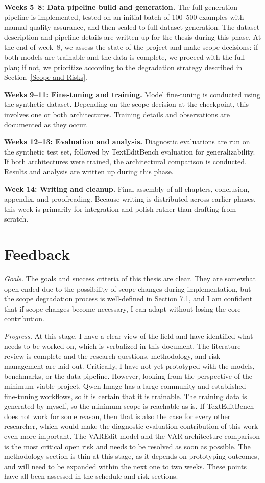 \textbf{Weeks 5--8: Data pipeline build and generation.} The full generation pipeline is implemented, tested on an initial batch of 100--500 examples with manual quality assurance, and then scaled to full dataset generation. The dataset description and pipeline details are written up for the thesis during this phase. At the end of week~8, we assess the state of the project and make scope decisions: if both models are trainable and the data is complete, we proceed with the full plan; if not, we prioritize according to the degradation strategy described in Section~\ref{Scope and Risks}.

\textbf{Weeks 9--11: Fine-tuning and training.} Model fine-tuning is conducted using the synthetic dataset. Depending on the scope decision at the checkpoint, this involves one or both architectures. Training details and observations are documented as they occur.

\textbf{Weeks 12--13: Evaluation and analysis.} Diagnostic evaluations are run on the synthetic test set, followed by TextEditBench evaluation for generalizability. If both architectures were trained, the architectural comparison is conducted. Results and analysis are written up during this phase.

\textbf{Week 14: Writing and cleanup.} Final assembly of all chapters, conclusion, appendix, and proofreading. Because writing is distributed across earlier phases, this week is primarily for integration and polish rather than drafting from scratch.

\chapter{Feedback} \label{Feedback}

\textit{Goals.} The goals and success criteria of this thesis are clear. They are somewhat open-ended due to the possibility of scope changes during implementation, but the scope degradation process is well-defined in Section 7.1, and I am confident that if scope changes become necessary, I can adapt without losing the core contribution.

\textit{Progress.} At this stage, I have a clear view of the field and have identified what needs to be worked on, which is verbalized in this document. The literature review is complete and the research questions, methodology, and risk management are laid out. Critically, I have not yet prototyped with the models, benchmarks, or the data pipeline. However, looking from the perspective of the minimum viable project, Qwen-Image has a large community and established fine-tuning workflows, so it is certain that it is trainable. The training data is generated by myself, so the minimum scope is reachable as-is. If TextEditBench does not work for some reason, then that is also the case for every other researcher, which would make the diagnostic evaluation contribution of this work even more important. The VAREdit model and the VAR architecture comparison is the most critical open risk and needs to be resolved as soon as possible. The methodology section is thin at this stage, as it depends on prototyping outcomes, and will need to be expanded within the next one to two weeks. These points have all been assessed in the schedule and risk sections.


